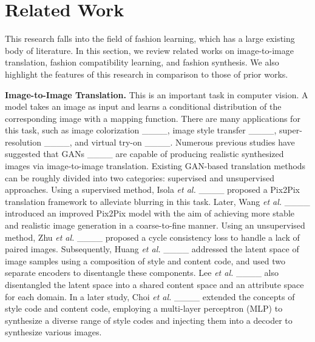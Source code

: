 \section{Related Work}
\label{related_work}
This research falls into the field of fashion learning, which has a large existing body of literature. In this section, we review related works on image-to-image translation, fashion compatibility learning, and fashion synthesis. We also highlight the features of this research in comparison to those of prior works.

\textbf{Image-to-Image Translation.} This is an important task in computer vision. A model takes an image as input and learns a conditional distribution of the corresponding image with a mapping function. There are many applications for this task, such as image colorization ____, image style transfer ____, super-resolution ____, and virtual try-on ____. Numerous previous studies have suggested that GANs ____ are capable of producing realistic synthesized images via image-to-image translation. Existing GAN-based translation methods can be roughly divided into two categories: supervised and unsupervised approaches. Using a supervised method, Isola \textit{et al.} ____ proposed a Pix2Pix translation framework to alleviate blurring in this task. Later, Wang \textit{et al.} ____ introduced an improved Pix2Pix model with the aim of achieving more stable and realistic image generation in a coarse-to-fine manner. Using an unsupervised method, Zhu \textit{et al.} ____ proposed a cycle consistency loss to handle a lack of paired images. Subsequently, Huang \textit{et al.} ____ addressed the latent space of image samples using a composition of style and content code, and used two separate encoders to disentangle these components. Lee \textit{et al.} ____ also disentangled the latent space into a shared content space and an attribute space for each domain. In a later study, Choi \textit{et al.} ____ extended the concepts of style code and content code, employing a multi-layer perceptron (MLP) to synthesize a diverse range of style codes and injecting them into a decoder to synthesize various images.

